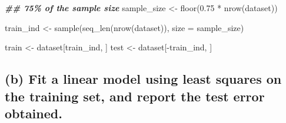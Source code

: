 \documentclass[
]{article}
\newenvironment{Shaded}{\begin{snugshade}}{\end{snugshade}}
\newcommand{\AttributeTok}[1]{\textcolor[rgb]{0.77,0.63,0.00}{#1}}
\newcommand{\CommentTok}[1]{\textcolor[rgb]{0.56,0.35,0.01}{\textit{#1}}}
\newcommand{\DocumentationTok}[1]{\textcolor[rgb]{0.56,0.35,0.01}{\textbf{\textit{#1}}}}
\newcommand{\FloatTok}[1]{\textcolor[rgb]{0.00,0.00,0.81}{#1}}
\newcommand{\FunctionTok}[1]{\textcolor[rgb]{0.00,0.00,0.00}{#1}}
\newcommand{\NormalTok}[1]{#1}
\newcommand{\OtherTok}[1]{\textcolor[rgb]{0.56,0.35,0.01}{#1}}
\newcommand{\SpecialCharTok}[1]{\textcolor[rgb]{0.00,0.00,0.00}{#1}}
\newcommand{\StringTok}[1]{\textcolor[rgb]{0.31,0.60,0.02}{#1}}
\begin{document}
\begin{Shaded}
\begin{Highlighting}[]
\DocumentationTok{\#\# 75\% of the sample size}
\NormalTok{sample\_size }\OtherTok{\textless{}{-}} \FunctionTok{floor}\NormalTok{(}\FloatTok{0.75} \SpecialCharTok{*} \FunctionTok{nrow}\NormalTok{(dataset))}


\NormalTok{train\_ind }\OtherTok{\textless{}{-}} \FunctionTok{sample}\NormalTok{(}\FunctionTok{seq\_len}\NormalTok{(}\FunctionTok{nrow}\NormalTok{(dataset)), }\AttributeTok{size =}\NormalTok{ sample\_size)}

\NormalTok{train }\OtherTok{\textless{}{-}}\NormalTok{ dataset[train\_ind, ]}
\NormalTok{test }\OtherTok{\textless{}{-}}\NormalTok{ dataset[}\SpecialCharTok{{-}}\NormalTok{train\_ind, ]}
\end{Highlighting}
\end{Shaded}

\hypertarget{b-fit-a-linear-model-using-least-squares-on-the-training-set-and-report-the-test-error-obtained.}{%
\subsection{(b) Fit a linear model using least squares on the training
set, and report the test error
obtained.}\label{b-fit-a-linear-model-using-least-squares-on-the-training-set-and-report-the-test-error-obtained.}}

\begin{Shaded}
\end{Shaded}
\end{document}

